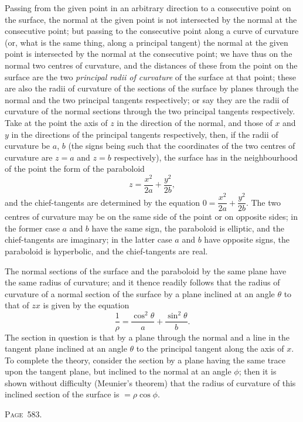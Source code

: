\documentclass[11pt,a4paper]{article}
\theoremstyle{definition}
\begin{document}
Passing from the given point in an arbitrary direction to a consecutive point on the surface, the normal at the given point is not intersected by the normal at the consecutive point; but passing to the consecutive point along a curve of curvature (or, what is the same thing, along a principal tangent) the normal at the given point is intersected by the normal at the consecutive point; we have thus on the normal two centres of curvature, and the distances of these from the point on the surface are the two \textit{principal radii of curvature} of the surface at that point; these are also the radii of curvature of the sections of the surface by planes through the normal and the two principal tangents respectively; or say they are the radii of curvature of the normal sections through the two principal tangents respectively. Take at the point the axis of $z$ in the direction of the normal, and those of $x$ and $y$ in the directions of the principal tangents respectively, then, if the radii of curvature be $a$, $b$ (the signs being such that the coordinates of the two centres of curvature are $z=a$ and $z=b$ respectively), the surface has in the neighbourhood of the point the form of the paraboloid
\[
z=\frac{x^2}{2a}+\frac{y^2}{2b},
\]
and the chief-tangents are determined by the equation $0=\dfrac{x^2}{2a}+\dfrac{y^2}{2b}$. The two centres of curvature may be on the same side of the point or on opposite sides; in the former case $a$ and $b$ have the same sign, the paraboloid is elliptic, and the chief-tangents are imaginary; in the latter case $a$ and $b$ have opposite signs, the paraboloid is hyperbolic, and the chief-tangents are real.

The normal sections of the surface and the paraboloid by the same plane have the same radius of curvature; and it thence readily follows that the radius of curvature of a normal section of the surface by a plane inclined at an angle $\theta$ to that of $zx$ is given by the equation
\[
\frac{1}{\rho}=\frac{\cos^2\theta}{a}+\frac{\sin^2\theta}{b}.
\]
The section in question is that by a plane through the normal and a line in the tangent plane inclined at an angle $\theta$ to the principal tangent along the axis of $x$. To complete the theory, consider the section by a plane having the same trace upon the tangent plane, but inclined to the normal at an angle $\phi$; then it is shown without difficulty (Meunier's theorem) that the radius of curvature of this inclined section of the surface is $=\rho\cos\phi$.

\newpage
\noindent\textsc{Page~583.}
\end{document}
